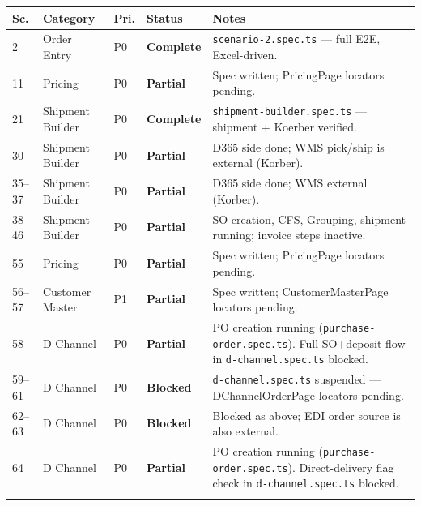 \documentclass[a4paper,11pt]{article}
\begin{document}
\vspace{0.3cm}
\renewcommand{\arraystretch}{1.25}
\begin{longtable}{p{} p{} p{} p{} p{}}
\toprule
\textbf{Sc.} & \textbf{Category} & \textbf{Pri.} & \textbf{Status} & \textbf{Notes} \\
\midrule
\endhead
2 & Order Entry & P0 & \textcolor{statusGreen}{\textbf{Complete}} & \texttt{scenario-2.spec.ts} — full E2E, Excel-driven. \\\relax
\cmidrule{1-5}
11 & Pricing & P0 & \textcolor{statusYellow}{\textbf{Partial}} & Spec written; PricingPage locators pending. \\\relax
\cmidrule{1-5}
21 & Shipment Builder & P0 & \textcolor{statusGreen}{\textbf{Complete}} & \texttt{shipment-builder.spec.ts} — shipment + Koerber verified. \\\relax
\cmidrule{1-5}
30 & Shipment Builder & P0 & \textcolor{statusYellow}{\textbf{Partial}} & D365 side done; WMS pick/ship is external (Korber). \\\relax
\cmidrule{1-5}
35--37 & Shipment Builder & P0 & \textcolor{statusYellow}{\textbf{Partial}} & D365 side done; WMS external (Korber). \\\relax
\cmidrule{1-5}
38--46 & Shipment Builder & P0 & \textcolor{statusYellow}{\textbf{Partial}} & SO creation, CFS, Grouping, shipment running; invoice steps inactive. \\\relax
\cmidrule{1-5}
55 & Pricing & P0 & \textcolor{statusYellow}{\textbf{Partial}} & Spec written; PricingPage locators pending. \\\relax
\cmidrule{1-5}
56--57 & Customer Master & P1 & \textcolor{statusYellow}{\textbf{Partial}} & Spec written; CustomerMasterPage locators pending. \\\relax
\cmidrule{1-5}
58 & D Channel & P0 & \textcolor{statusYellow}{\textbf{Partial}} & PO creation running (\texttt{purchase-order.spec.ts}). Full SO+deposit flow in \texttt{d-channel.spec.ts} blocked. \\\relax
\cmidrule{1-5}
59--61 & D Channel & P0 & \textcolor{statusYellow}{\textbf{Blocked}} & \texttt{d-channel.spec.ts} suspended — DChannelOrderPage locators pending. \\\relax
\cmidrule{1-5}
62--63 & D Channel & P0 & \textcolor{statusYellow}{\textbf{Blocked}} & Blocked as above; EDI order source is also external. \\\relax
\cmidrule{1-5}
64 & D Channel & P0 & \textcolor{statusYellow}{\textbf{Partial}} & PO creation running (\texttt{purchase-order.spec.ts}). Direct-delivery flag check in \texttt{d-channel.spec.ts} blocked. \\\relax

\end{longtable}
\end{document}
